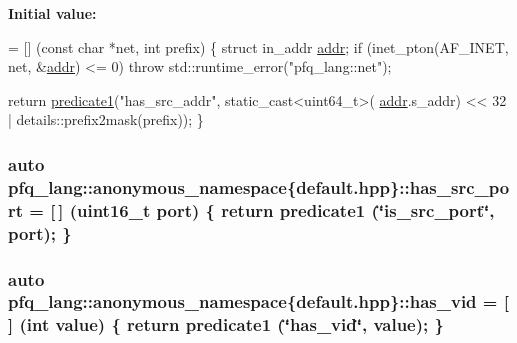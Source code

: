 {\bfseries Initial value\-:}
\begin{DoxyCode}
= [] (\textcolor{keyword}{const} \textcolor{keywordtype}{char} *net, \textcolor{keywordtype}{int} prefix)
        \{
            \textcolor{keyword}{struct }in\_addr \hyperlink{namespacepfq__lang_1_1anonymous__namespace_02default_8hpp_03_aafce8334d1be83bff9a2115439c8c453}{addr};
            \textcolor{keywordflow}{if} (inet\_pton(AF\_INET, net, &\hyperlink{namespacepfq__lang_1_1anonymous__namespace_02default_8hpp_03_aafce8334d1be83bff9a2115439c8c453}{addr}) <= 0)
                \textcolor{keywordflow}{throw} std::runtime\_error(\textcolor{stringliteral}{"pfq\_lang::net"});

            \textcolor{keywordflow}{return} \hyperlink{namespacepfq__lang_ae23a03cee94b5ddfde4a8d2e5c521f0e}{predicate1}(\textcolor{stringliteral}{"has\_src\_addr"}, static\_cast<uint64\_t>(
      \hyperlink{namespacepfq__lang_1_1anonymous__namespace_02default_8hpp_03_aafce8334d1be83bff9a2115439c8c453}{addr}.s\_addr) << 32 | details::prefix2mask(prefix));
        \}
\end{DoxyCode}
\hypertarget{namespacepfq__lang_1_1anonymous__namespace_02default_8hpp_03_ad6d8ed8e08a448b3bf5d23a929d887f9}{
\subsubsection[{has\-\_\-src\-\_\-port}]{\setlength{\rightskip}{0pt plus 5cm}auto pfq\-\_\-lang\-::anonymous\-\_\-namespace\{default.\-hpp\}\-::has\-\_\-src\-\_\-port = \mbox{[}$\,$\mbox{]} (uint16\-\_\-t {\bf port}) \{ return {\bf predicate1} (\char`\"{}is\-\_\-src\-\_\-port\char`\"{}, port); \}}}\label{namespacepfq__lang_1_1anonymous__namespace_02default_8hpp_03_ad6d8ed8e08a448b3bf5d23a929d887f9}
\hypertarget{namespacepfq__lang_1_1anonymous__namespace_02default_8hpp_03_adddd2dea56164719f2853af158911a80}{
\subsubsection[{has\-\_\-vid}]{\setlength{\rightskip}{0pt plus 5cm}auto pfq\-\_\-lang\-::anonymous\-\_\-namespace\{default.\-hpp\}\-::has\-\_\-vid = \mbox{[}$\,$\mbox{]} (int value) \{ return {\bf predicate1} (\char`\"{}has\-\_\-vid\char`\"{}, value); \}}}\label{namespacepfq__lang_1_1anonymous__namespace_02default_8hpp_03_adddd2dea56164719f2853af158911a80}
